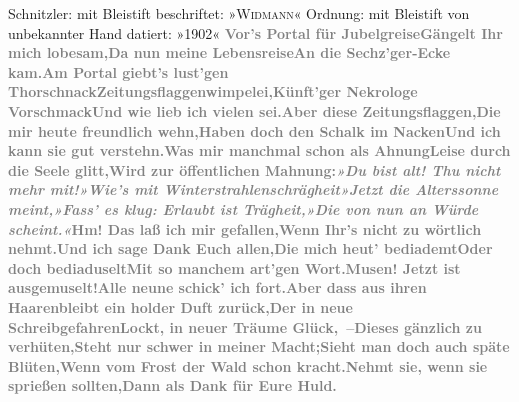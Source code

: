\begin{ledgroupsized}[t]{13cm}
{\newline{}Schnitzler: mit Bleistift beschriftet: »\textsc{Widmann}« \newline{}Ordnung: mit Bleistift von unbekannter Hand datiert: »1902« }\toendnotes[C]{\smallbreak}\stanza{}{\pb}\textcolor{gray}{\textbf{Vor’s Portal für Jubelgreise}}\newverse{}\textcolor{gray}{\textbf{Gängelt Ihr mich lobesam,}}\newverse{}\textcolor{gray}{\textbf{Da nun meine Lebensreise}}\newverse{}\textcolor{gray}{\textbf{An die Sechz’ger-Ecke kam.}}\stanzaend{}\stanza{}\textcolor{gray}{\textbf{Am Portal giebt’s lust’gen Thorschnack}}\newverse{}\textcolor{gray}{\textbf{Zeitungsflaggenwimpelei,}}\newverse{}\textcolor{gray}{\textbf{Künft’ger Nekrologe Vorschmack}}\newverse{}\textcolor{gray}{\textbf{Und wie lieb ich vielen sei.}}\stanzaend{}\stanza{}\textcolor{gray}{\textbf{Aber diese Zeitungsflaggen,}}\newverse{}\textcolor{gray}{\textbf{Die mir heute freundlich wehn,}}\newverse{}\textcolor{gray}{\textbf{Haben doch den Schalk im Nacken}}\newverse{}\textcolor{gray}{\textbf{Und ich kann sie gut verstehn.}}\stanzaend{}\stanza{}\textcolor{gray}{\textbf{Was mir manchmal schon als Ahnung}}\newverse{}\textcolor{gray}{\textbf{Leise durch die Seele glitt,}}\newverse{}\textcolor{gray}{\textbf{Wird zur öffentlichen Mahnung:}}\newverse{}\textcolor{gray}{\textbf{\emph{»Du bist alt! Thu nicht mehr mit!}}}\stanzaend{}\stanza{}\textcolor{gray}{\textbf{\emph{»Wie’s mit Winterstrahlenschrägheit}}}\newverse{}\textcolor{gray}{\textbf{\emph{»Jetzt die Alterssonne meint,}}}\newverse{}\textcolor{gray}{\textbf{\emph{»Fass’ es klug: Erlaubt ist Trägheit,}}}\newverse{}\textcolor{gray}{\textbf{\emph{»Die von nun an Würde scheint.«}}}\stanzaend{}\stanza{}{\pb}\textcolor{gray}{\textbf{Hm! Das laß ich mir gefallen,}}\newverse{}\textcolor{gray}{\textbf{Wenn Ihr’s nicht zu wörtlich nehmt.}}\newverse{}\textcolor{gray}{\textbf{Und ich sage Dank Euch allen,}}\newverse{}\textcolor{gray}{\textbf{Die mich heut’ bediademt}}\stanzaend{}\stanza{}\textcolor{gray}{\textbf{Oder doch bediaduselt}}\newverse{}\textcolor{gray}{\textbf{Mit so manchem art’gen Wort.}}\newverse{}\textcolor{gray}{\textbf{Musen! Jetzt ist ausgemuselt!}}\newverse{}\textcolor{gray}{\textbf{Alle neune schick’ ich fort.}}\stanzaend{}\stanza{}\textcolor{gray}{\textbf{Aber dass aus ihren Haaren}}\newverse{}\textcolor{gray}{\textbf{bleibt ein holder Duft zurück,}}\newverse{}\textcolor{gray}{\textbf{Der in neue Schreibgefahren}}\newverse{}\textcolor{gray}{\textbf{Lockt, in neuer Träume Glück, –}}\stanzaend{}\stanza{}\textcolor{gray}{\textbf{Dieses gänzlich zu verhüten,}}\newverse{}\textcolor{gray}{\textbf{Steht nur schwer in meiner Macht;}}\newverse{}\textcolor{gray}{\textbf{Sieht man doch auch späte Blüten,}}\newverse{}\textcolor{gray}{\textbf{Wenn vom Frost der Wald schon kracht.}}\stanzaend{}\stanza{}\textcolor{gray}{\textbf{Nehmt sie, wenn sie sprießen sollten,}}\newverse{}\textcolor{gray}{\textbf{Dann als Dank für Eure Huld.}}\newverse{}\textcolor{gray}{\textbf{}}\newverse{}\textcolor{gray}{\textbf{}}\stanzaend{}\pstart

\end{ledgroupsized}
